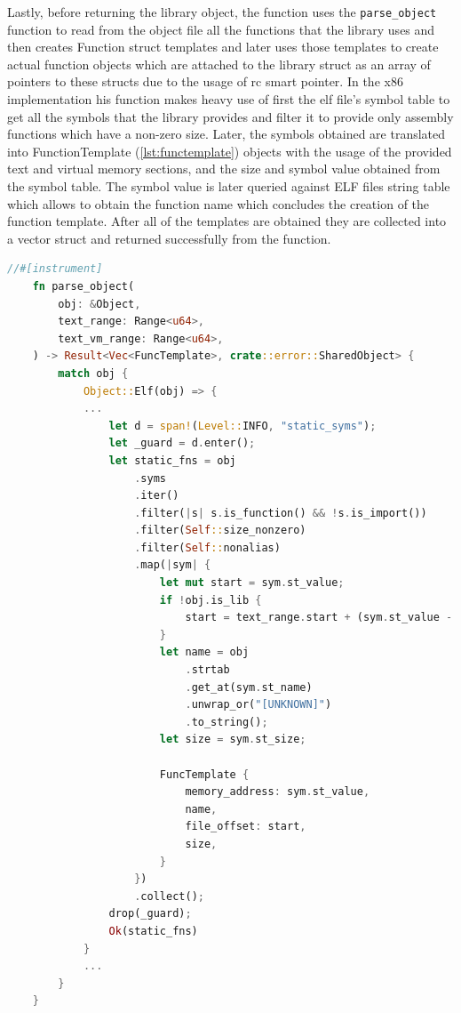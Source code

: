Lastly, before returning the library object, the function uses the \verb|parse_object| function to read from the object file all the functions that the library uses and then creates Function struct templates and later uses those templates to create actual function objects which are attached to the library struct as an array of pointers to these structs due to the usage of rc smart pointer.
In the x86 implementation his function makes heavy use of first the elf file's symbol table to get all the symbols that the library provides and filter it to provide only assembly functions which have a non-zero size.
Later, the symbols obtained are translated into FunctionTemplate (\autoref{lst:functemplate}) objects with the usage of the provided text and virtual memory sections, and the size and symbol value obtained from the symbol table. 
The symbol value is later queried against ELF files string table which allows to obtain the function name which concludes the creation of the function template.
After all of the templates are obtained they are collected into a vector struct and returned successfully from the function.

\begin{lstlisting}[language=Rust]
//#[instrument]
    fn parse_object(
        obj: &Object,
        text_range: Range<u64>,
        text_vm_range: Range<u64>,
    ) -> Result<Vec<FuncTemplate>, crate::error::SharedObject> {
        match obj {
            Object::Elf(obj) => {
            ...
                let d = span!(Level::INFO, "static_syms");
                let _guard = d.enter();
                let static_fns = obj
                    .syms
                    .iter()
                    .filter(|s| s.is_function() && !s.is_import())
                    .filter(Self::size_nonzero)
                    .filter(Self::nonalias)
                    .map(|sym| {
                        let mut start = sym.st_value;
                        if !obj.is_lib {
                            start = text_range.start + (sym.st_value - text_vm_range.start);
                        }
                        let name = obj
                            .strtab
                            .get_at(sym.st_name)
                            .unwrap_or("[UNKNOWN]")
                            .to_string();
                        let size = sym.st_size;

                        FuncTemplate {
                            memory_address: sym.st_value,
                            name,
                            file_offset: start,
                            size,
                        }
                    })
                    .collect();
                drop(_guard);
                Ok(static_fns)
            }
            ...
        }
    }    
\end{lstlisting}

